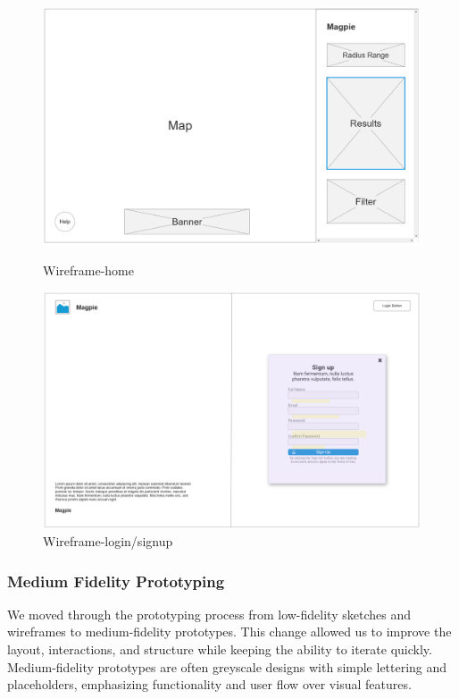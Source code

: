 \begin{figure}[htbp]
    \centering
    \begin{minipage}{0.48\textwidth}
        \centering
        \includegraphics[width=\textwidth]{images/wireframe-home.jpg}
        \caption{Wireframe-home}
        \label{fig:wireframe-home}
    \end{minipage}
    \hfill
    \begin{minipage}{0.48\textwidth}
        \centering
        \includegraphics[width=\textwidth]{images/wireframe-signup.jpg}
        \caption{Wireframe-login/signup}
        \label{fig:wireframe-signup}
    \end{minipage}
\end{figure}

\subsubsection{Medium Fidelity Prototyping}
We moved through the prototyping process from low-fidelity sketches and
wireframes to medium-fidelity prototypes. This change allowed us to improve the
layout, interactions, and structure while keeping the ability to iterate
quickly. Medium-fidelity prototypes are often greyscale designs with simple
lettering and placeholders, emphasizing functionality and user flow over visual
features.

